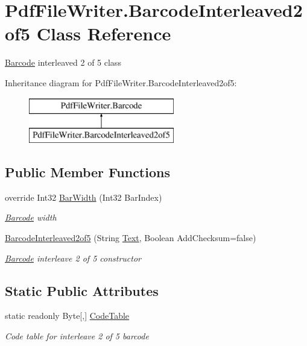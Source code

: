 \hypertarget{class_pdf_file_writer_1_1_barcode_interleaved2of5}{}\section{Pdf\+File\+Writer.\+Barcode\+Interleaved2of5 Class Reference}
\label{class_pdf_file_writer_1_1_barcode_interleaved2of5}


\hyperlink{class_pdf_file_writer_1_1_barcode}{Barcode} interleaved 2 of 5 class  


Inheritance diagram for Pdf\+File\+Writer.\+Barcode\+Interleaved2of5\+:\begin{figure}[H]
\begin{center}
\leavevmode
\includegraphics[height=2.000000cm]{class_pdf_file_writer_1_1_barcode_interleaved2of5}
\end{center}
\end{figure}
\subsection*{Public Member Functions}
\begin{DoxyCompactItemize}
\item 
override Int32 \hyperlink{class_pdf_file_writer_1_1_barcode_interleaved2of5_ae5dcb81d228b62e575d1be5ae7a2a3cf}{Bar\+Width} (Int32 Bar\+Index)
\begin{DoxyCompactList}\small\item\em \hyperlink{class_pdf_file_writer_1_1_barcode}{Barcode} width \end{DoxyCompactList}\item 
\hyperlink{class_pdf_file_writer_1_1_barcode_interleaved2of5_a10b87478b7c8d75f4251297cc7399a51}{Barcode\+Interleaved2of5} (String \hyperlink{class_pdf_file_writer_1_1_barcode_a1fe2157662e4a1b52264823a382fde3f}{Text}, Boolean Add\+Checksum=false)
\begin{DoxyCompactList}\small\item\em \hyperlink{class_pdf_file_writer_1_1_barcode}{Barcode} interleave 2 of 5 constructor \end{DoxyCompactList}\end{DoxyCompactItemize}
\subsection*{Static Public Attributes}
\begin{DoxyCompactItemize}
\item 
static readonly Byte\mbox{[},\mbox{]} \hyperlink{class_pdf_file_writer_1_1_barcode_interleaved2of5_a687943c4939f75edd4f44bf88f5b6ce2}{Code\+Table}
\begin{DoxyCompactList}\small\item\em Code table for interleave 2 of 5 barcode \end{DoxyCompactList}\end{DoxyCompactItemize}
